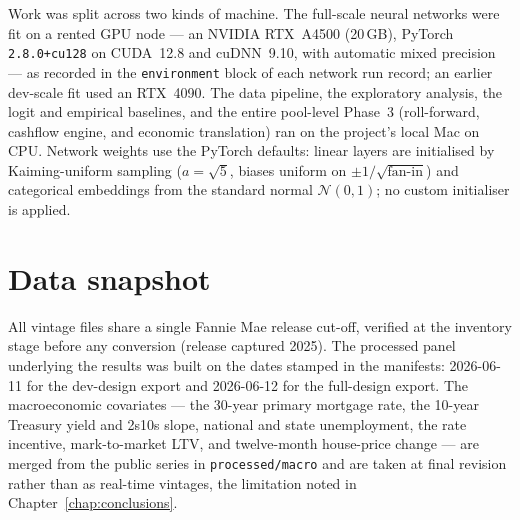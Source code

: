 Work was split across two kinds of machine. The full-scale neural
networks were fit on a rented GPU node --- an NVIDIA RTX~A4500 (20\,GB),
PyTorch \texttt{2.8.0+cu128} on CUDA~12.8 and cuDNN~9.10, with automatic
mixed precision --- as recorded in the \texttt{environment} block of
each network run record; an earlier dev-scale fit used an RTX~4090. The
data pipeline, the exploratory analysis, the logit and empirical
baselines, and the entire pool-level Phase~3 (roll-forward, cashflow
engine, and economic translation) ran on the project's local Mac on
CPU. Network weights use the PyTorch defaults: linear layers are
initialised by Kaiming-uniform sampling ($a=\sqrt{5}$, biases uniform on
$\pm 1/\sqrt{\text{fan-in}}$) and categorical embeddings from the
standard normal $\mathcal{N}(0,1)$; no custom initialiser is applied.

\section{Data snapshot}
\label{sec:repro-snapshot}

All vintage files share a single Fannie Mae release cut-off, verified at
the inventory stage before any conversion
(release captured 2025). The processed panel underlying the results was
built on the dates stamped in the manifests: 2026-06-11 for the
dev-design export and 2026-06-12 for the full-design export. The
macroeconomic covariates --- the 30-year primary mortgage rate, the
10-year Treasury yield and 2s10s slope, national and state unemployment,
the rate incentive, mark-to-market LTV, and twelve-month house-price
change --- are merged from the public series in \texttt{processed/macro}
and are taken at final revision rather than as real-time vintages, the
limitation noted in Chapter~\ref{chap:conclusions}.
